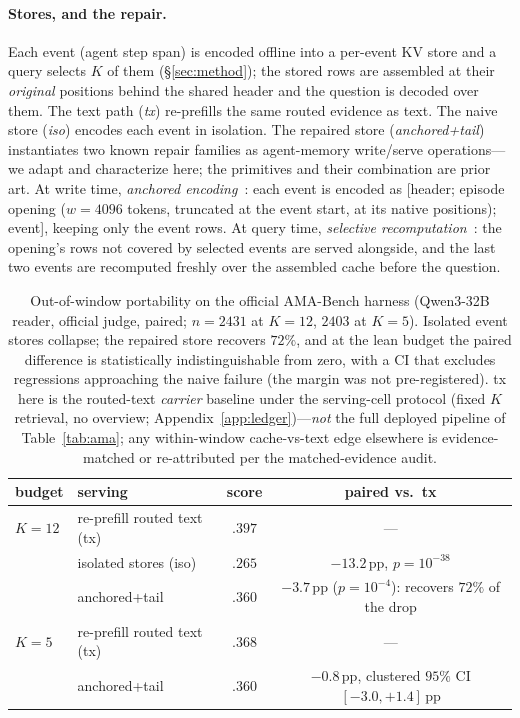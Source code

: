 \documentclass{article} %
\newcommand{\pp}{\,\mathrm{pp}}
\begin{document}
\paragraph{Stores, and the repair.} Each event (agent step span) is encoded offline into a
per-event KV store and a query selects $K$ of them (\S\ref{sec:method}); the stored rows are
assembled at their \emph{original} positions behind the shared header and the question is
decoded over them. The text path (\emph{tx}) re-prefills the same routed evidence as text.
The naive store (\emph{iso}) encodes each event in isolation. The repaired store
(\emph{anchored+tail}) instantiates two known repair families as agent-memory write/serve
operations---we adapt and characterize here; the primitives and their combination are prior
art. At write time, \emph{anchored encoding}~\citep{star}: each event is encoded as
[header; episode opening ($w{=}4096$ tokens, truncated at the event start, at its native
positions); event], keeping only the event rows. At query time, \emph{selective
recomputation}~\citep{cacheblend,epic}: the opening's rows not covered by selected events
are served alongside, and the last two events are recomputed freshly over the assembled
cache before the question.

\begin{table}[t]
\centering
\caption{Out-of-window portability on the official AMA-Bench harness (Qwen3-32B reader,
official judge, paired; $n{=}2431$ at $K{=}12$, $2403$ at $K{=}5$). Isolated event stores
collapse; the repaired store recovers $72\%$, and at the lean budget the paired difference
is statistically indistinguishable from zero, with a CI that excludes regressions
approaching the naive failure (the margin was not pre-registered). tx here is the
routed-text \emph{carrier} baseline under the serving-cell protocol (fixed $K$ retrieval,
no overview; Appendix~\ref{app:ledger})---\emph{not} the full deployed pipeline of
Table~\ref{tab:ama}; any within-window cache-vs-text edge elsewhere is evidence-matched or
re-attributed per the matched-evidence audit.}
\label{tab:oow}
\footnotesize
\setlength{\tabcolsep}{5pt}
\begin{tabular}{llcc}
\toprule
budget & serving & score & paired vs.\ tx \\
\midrule
$K{=}12$ & re-prefill routed text (tx) & $.397$ & --- \\
 & isolated stores (iso) & $.265$ & $-13.2\pp$, $p{=}10^{-38}$ \\
 & anchored+tail & $.360$ & $-3.7\pp$ ($p{=}10^{-4}$): recovers $72\%$ of the drop \\
\midrule
$K{=}5$ & re-prefill routed text (tx) & $.368$ & --- \\
 & anchored+tail & $.360$ & $-0.8\pp$, clustered $95\%$ CI $[-3.0,+1.4]\pp$ \\
\bottomrule
\end{tabular}
\end{table}
\end{document}
